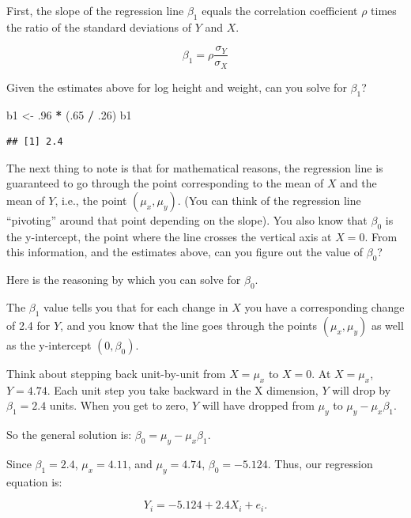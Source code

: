 \documentclass[]{book}
\newenvironment{Shaded}{\begin{snugshade}}{\end{snugshade}}
\newcommand{\DecValTok}[1]{\textcolor[rgb]{0.00,0.00,0.81}{#1}}
\newcommand{\FloatTok}[1]{\textcolor[rgb]{0.00,0.00,0.81}{#1}}
\newcommand{\NormalTok}[1]{#1}
\newcommand{\OperatorTok}[1]{\textcolor[rgb]{0.81,0.36,0.00}{\textbf{#1}}}
\newcommand{\StringTok}[1]{\textcolor[rgb]{0.31,0.60,0.02}{#1}}
\begin{document}
First, the slope of the regression line \(\beta_1\) equals the correlation coefficient \(\rho\) times the ratio of the standard deviations of \(Y\) and \(X\).

\[\beta_1 = \rho \frac{\sigma_Y}{\sigma_X}\]

Given the estimates above for log height and weight, can you solve for \(\beta_1\)?

\begin{Shaded}
\begin{Highlighting}[]
\NormalTok{b1 <-}\StringTok{ }\FloatTok{.96} \OperatorTok{*}\StringTok{ }\NormalTok{(.}\DecValTok{65} \OperatorTok{/}\StringTok{ }\FloatTok{.26}\NormalTok{)}
\NormalTok{b1}
\end{Highlighting}
\end{Shaded}

\begin{verbatim}
## [1] 2.4
\end{verbatim}

The next thing to note is that for mathematical reasons, the regression line is guaranteed to go through the point corresponding to the mean of \(X\) and the mean of \(Y\), i.e., the point \((\mu_x, \mu_y)\). (You can think of the regression line ``pivoting'' around that point depending on the slope). You also know that \(\beta_0\) is the y-intercept, the point where the line crosses the vertical axis at \(X = 0\). From this information, and the estimates above, can you figure out the value of \(\beta_0\)?

Here is the reasoning by which you can solve for \(\beta_0\).

The \(\beta_1\) value tells you that for each change in \(X\) you have a corresponding change of 2.4 for \(Y\), and you know that the line goes through the points \((\mu_x, \mu_y)\) as well as the y-intercept \((0, \beta_0)\).

Think about stepping back unit-by-unit from \(X = \mu_x\) to \(X = 0\).
At \(X = \mu_x\), \(Y = 4.74\). Each unit step you take backward in the X dimension, \(Y\) will drop by \(\beta_1 = 2.4\) units. When you get to zero, \(Y\) will have dropped from \(\mu_y\) to \(\mu_y - \mu_x\beta_1\).

So the general solution is: \(\beta_0 = \mu_y - \mu_x\beta_1\).

Since \(\beta_1 = 2.4\), \(\mu_x = 4.11\), and \(\mu_y = 4.74\), \(\beta_0 = -5.124\). Thus, our regression equation is:

\[Y_i =  -5.124 + 2.4X_i + e_i.\]
\end{document}

